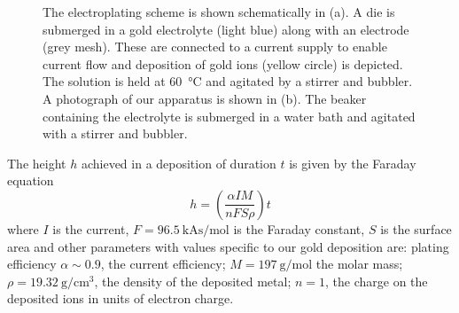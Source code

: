 \begin{figure}[phtb]
{
  } %
  \caption[Electroplating scheme and apparatus]{
    The electroplating scheme is shown schematically in (a). A die is submerged in a gold electrolyte
    (light blue) along with an electrode (grey mesh). These are connected to a
    current supply to enable current flow and deposition of gold ions (yellow
    circle)  is depicted. The solution is held at \SI{60}{\celsius} and
    agitated by a stirrer and bubbler. A photograph of our apparatus is shown
    in (b). The beaker containing the electrolyte is submerged in a water bath
    and agitated with a stirrer and bubbler.
  }
  \label{fab:fig:eplate}
\end{figure}

The height $h$ achieved in a deposition of duration $t$ is given by the Faraday
equation~\cite{Ruythooren_2000}
%
\begin{equation}
  h = \left(\frac{\alpha I M}{nFS\rho}\right)t
  \label{fab:eqn:faraday}
\end{equation}
%
where $I$ is the current, $F=\SI{96.5}{\kilo\ampere\second\per\mole}$ is the
Faraday constant, $S$ is the surface area and other parameters with values
specific to our gold deposition are: plating efficiency $\alpha\sim0.9$, the current efficiency;
$M = \SI{197}{\gram\per\mole}$ the molar mass;
$\rho=\SI{19.32}{\gram\per\centi\meter\cubed}$, the density of the deposited
metal; $n=1$, the charge on the deposited ions in units of electron charge.

